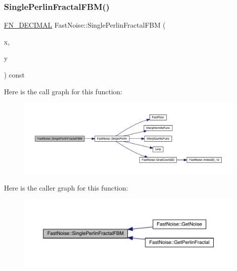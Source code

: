 \subsubsection{\texorpdfstring{Single\+Perlin\+Fractal\+F\+B\+M()}{SinglePerlinFractalFBM()}\hspace{0.1cm}{\footnotesize\ttfamily [1/2]}}
{\footnotesize\ttfamily \mbox{\hyperlink{_fast_noise_8h_a75a9ef6d2541c4921815b885bfd449c3}{F\+N\+\_\+\+D\+E\+C\+I\+M\+AL}} Fast\+Noise\+::\+Single\+Perlin\+Fractal\+F\+BM (\begin{DoxyParamCaption}\item[{\mbox{\hyperlink{_fast_noise_8h_a75a9ef6d2541c4921815b885bfd449c3}{F\+N\+\_\+\+D\+E\+C\+I\+M\+AL}}}]{x,  }\item[{\mbox{\hyperlink{_fast_noise_8h_a75a9ef6d2541c4921815b885bfd449c3}{F\+N\+\_\+\+D\+E\+C\+I\+M\+AL}}}]{y }\end{DoxyParamCaption}) const\hspace{0.3cm}{\ttfamily [private]}}

Here is the call graph for this function\+:
\nopagebreak
\begin{figure}[H]
\begin{center}
\leavevmode
\includegraphics[width=350pt]{d1/dd8/class_fast_noise_a6f38e0737ecab4f680e41936f5381141_cgraph}
\end{center}
\end{figure}
Here is the caller graph for this function\+:
\nopagebreak
\begin{figure}[H]
\begin{center}
\leavevmode
\includegraphics[width=350pt]{d1/dd8/class_fast_noise_a6f38e0737ecab4f680e41936f5381141_icgraph}
\end{center}
\end{figure}
\mbox{\label{class_fast_noise_ab2189c13cfabb4e900c6e63d74962ce2}} 
